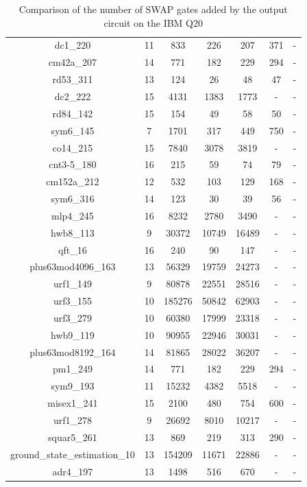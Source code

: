 \documentclass[runningheads]{llncs}
\begin{document}
\begin{table}[H]
\begin{center}
\begin{tabular}{|c|c|c|c|c|c|c|}
dc1\_220 & 11 & 833 & 226 & 207 & 371 & - \\ 
cm42a\_207 & 14 & 771 & 182 & 229 & 294 & - \\ 
rd53\_311 & 13 & 124 & 26 & 48 & 47 & - \\ 
dc2\_222 & 15 & 4131 & 1383 & 1773 & - & - \\ 
rd84\_142 & 15 & 154 & 49 & 58 & 50 & - \\ 
sym6\_145 & 7 & 1701 & 317 & 449 & 750 & - \\ 
co14\_215 & 15 & 7840 & 3078 & 3819 & - & - \\ 
cnt3-5\_180 & 16 & 215 & 59 & 74 & 79 & - \\ 
cm152a\_212 & 12 & 532 & 103 & 129 & 168 & - \\ 
sym6\_316 & 14 & 123 & 30 & 39 & 56 & - \\ 
mlp4\_245 & 16 & 8232 & 2780 & 3490 & - & - \\ 
hwb8\_113 & 9 & 30372 & 10749 & 16489 & - & - \\ 
qft\_16 & 16 & 240 & 90 & 147 & - & - \\ 
plus63mod4096\_163 & 13 & 56329 & 19759 & 24273 & - & - \\ 
urf1\_149 & 9 & 80878 & 22551 & 28516 & - & - \\ 
urf3\_155 & 10 & 185276 & 50842 & 62903 & - & - \\ 
urf3\_279 & 10 & 60380 & 17999 & 23318 & - & - \\ 
hwb9\_119 & 10 & 90955 & 22946 & 30031 & - & - \\ 
plus63mod8192\_164 & 14 & 81865 & 28022 & 36207 & - & - \\ 
pm1\_249 & 14 & 771 & 182 & 229 & 294 & - \\ 
sym9\_193 & 11 & 15232 & 4382 & 5518 & - & - \\ 
misex1\_241 & 15 & 2100 & 480 & 754 & 600 & - \\ 
urf1\_278 & 9 & 26692 & 8010 & 10217 & - & - \\ 
squar5\_261 & 13 & 869 & 219 & 313 & 290 & - \\ 
ground\_state\_estimation\_10 & 13 & 154209 & 11671 & 22886 & - & - \\ 
adr4\_197 & 13 & 1498 & 516 & 670 & - & - \\ 
			\hline
			\end{tabular} 
			\end{center}	
			\caption{Comparison of  the number of SWAP gates added by the 
			output circuit on the IBM Q20 }
			\label{tab4}  
			\end{table}
\end{document}
